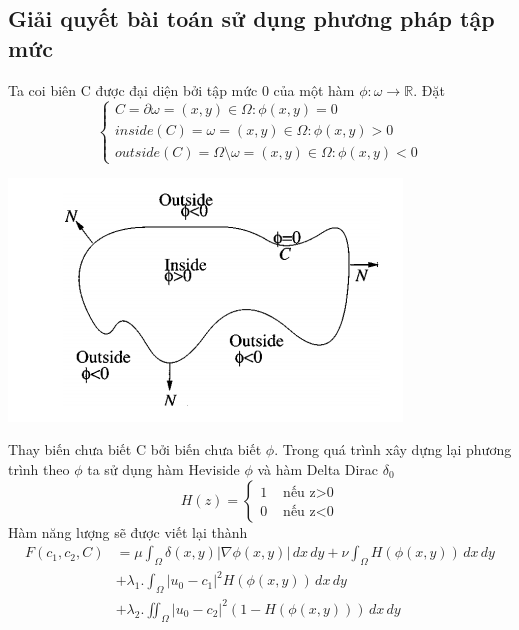\documentclass[12pt, oneside, a4]{book}
\begin{document}
\subsection{Giải quyết bài toán sử dụng phương pháp tập mức}
Ta coi biên C được đại diện bởi tập mức 0 của một hàm $\phi: \omega \rightarrow \mathbb{R}$. Đặt 
\begin{equation*}
\begin{cases}
 C= \partial \omega ={(x,y)\in \Omega: \phi(x,y)=0}\\
 inside(C)= \omega={(x,y)\in \Omega: \phi(x,y)>0}\\
 outside(C)=\Omega \setminus \omega ={(x,y)\in \Omega: \phi(x,y)<0}
   \end{cases}
\end{equation*}
 \begin{center}
\includegraphics[scale=0.6]{figure/insideoutside.png}
\end{center}
Thay biến chưa biết C bởi biến chưa biết $\phi$.  Trong quá trình xây dựng lại phương trình theo $\phi$ ta sử dụng hàm Heviside $\phi$ và hàm Delta Dirac $\delta_0$
 \begin{equation*}
 H(z)=
\begin{cases}
 1 & \text{ nếu z>0}\\
0 & \text{ nếu z<0}
   \end{cases}
\end{equation*}
Hàm năng lượng sẽ được viết lại thành
\begin{equation*}
\begin{split}
F(c_1, c_2, C)&=\mu \int_{\Omega}\delta(x,y)|\nabla \phi(x,y)|\,dx\,dy+\nu  \int_{\Omega}H( \phi(x,y))\,dx\,dy \\ 
&+\lambda_1 .\int_{\Omega} |u_0-c_1|^2H(\phi(x,y)) \,dx\,dy\\&+\lambda_2 .\iint_{\Omega} |u_0-c_2|^2(1-H(\phi(x,y))) \,dx\,dy
\end{split}
\end{equation*}
\end{document}
